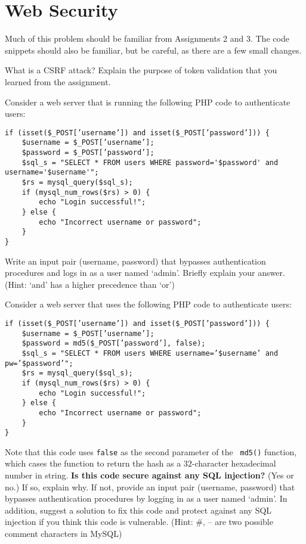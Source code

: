 \newpage
\section{Web Security}

Much of this problem should be familiar from Assignments 2 and 3. The
code snippets should also be familiar, but be careful, as there are a few small
changes.

What is a CSRF attack? Explain the purpose of token validation that you learned
from the assignment.

\eprob
\vspace*{0.5in}

 Consider a web server that is running the following PHP code to authenticate
users:
{\footnotesize
\begin{verbatim}
if (isset($_POST[’username’]) and isset($_POST[’password’])) {
    $username = $_POST[’username’];
    $password = $_POST[’password’];
    $sql_s = "SELECT * FROM users WHERE password='$password' and username='$username'";
    $rs = mysql_query($sql_s);
    if (mysql_num_rows($rs) > 0) {
        echo "Login successful!";
    } else {
        echo "Incorrect username or password";
    }
}
\end{verbatim}
}
Write an input pair (username, password) that bypasses authentication procedures
and logs in as a user named `admin'. Briefly explain your answer. (Hint: `and' has
a higher precedence than `or')
\eprob


 Consider a web server that uses the following PHP code to authenticate 
users:
{\footnotesize
\begin{verbatim}
if (isset($_POST[’username’]) and isset($_POST[’password’])) {
    $username = $_POST[’username’];
    $password = md5($_POST[’password’], false);
    $sql_s = "SELECT * FROM users WHERE username=’$username’ and pw=’$password’";
    $rs = mysql_query($sql_s);
    if (mysql_num_rows($rs) > 0) {
        echo "Login successful!";
    } else {
        echo "Incorrect username or password";
    }
}
\end{verbatim}
}

Note that this code uses {\tt false} as the second parameter of the {\tt
md5()} function, which cases the function to return the hash as a $32$-character
hexadecimal number in string. {\bf Is this code secure against any SQL
injection?} (Yes or no.) If so, explain why. If not, provide an input pair
(username, password) that bypasses authentication procedures by logging in as
a user named `admin'. In addition, suggest a solution to fix this code and
protect against any SQL injection if you think this code is vulnerable. (Hint:
\#, -- are two possible comment characters in MySQL)

